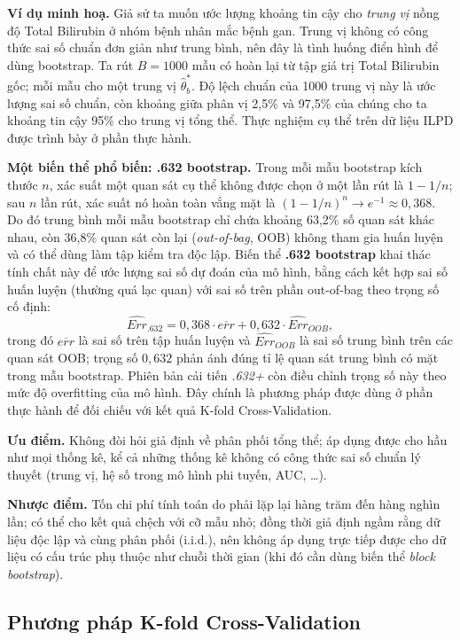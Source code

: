 \documentclass[14pt,a4paper]{extarticle}\usepackage[]{graphicx}\usepackage[]{xcolor}
\begin{document}
\textbf{Ví dụ minh hoạ.} Giả sử ta muốn ước lượng khoảng tin cậy cho
\emph{trung vị} nồng độ Total Bilirubin ở nhóm bệnh nhân mắc bệnh gan.
Trung vị không có công thức sai số chuẩn đơn giản như trung bình, nên đây
là tình huống điển hình để dùng bootstrap. Ta rút $B = 1000$ mẫu có hoàn
lại từ tập giá trị Total Bilirubin gốc; mỗi mẫu cho một trung vị
$\hat{\theta}^{*}_{b}$. Độ lệch chuẩn của 1000 trung vị này là ước lượng
sai số chuẩn, còn khoảng giữa phân vị 2,5\% và 97,5\% của chúng cho ta
khoảng tin cậy 95\% cho trung vị tổng thể. Thực nghiệm cụ thể trên dữ liệu
ILPD được trình bày ở phần thực hành.

\textbf{Một biến thể phổ biến: .632 bootstrap.} Trong mỗi mẫu bootstrap
kích thước $n$, xác suất một quan sát cụ thể không được chọn ở một lần rút
là $1 - 1/n$; sau $n$ lần rút, xác suất nó hoàn toàn vắng mặt là
$(1 - 1/n)^{n} \to e^{-1} \approx 0{,}368$. Do đó trung bình mỗi mẫu
bootstrap chỉ chứa khoảng 63,2\% số quan sát khác nhau, còn 36,8\% quan
sát còn lại (\emph{out-of-bag}, OOB) không tham gia huấn luyện và có thể
dùng làm tập kiểm tra độc lập. Biến thể \textbf{.632 bootstrap} khai thác
tính chất này để ước lượng sai số dự đoán của mô hình, bằng cách kết hợp
sai số huấn luyện (thường quá lạc quan) với sai số trên phần out-of-bag
theo trọng số cố định:
\[
  \widehat{Err}_{.632} = 0{,}368 \cdot \overline{err}
  + 0{,}632 \cdot \widehat{Err}_{OOB},
\]
trong đó $\overline{err}$ là sai số trên tập huấn luyện và
$\widehat{Err}_{OOB}$ là sai số trung bình trên các quan sát OOB; trọng
số $0{,}632$ phản ánh đúng tỉ lệ quan sát trung bình có mặt trong
mẫu bootstrap. Phiên bản cải tiến \emph{.632+} còn điều chỉnh trọng số này
theo mức độ overfitting của mô hình. Đây chính là phương pháp được dùng ở
phần thực hành để đối chiếu với kết quả K-fold Cross-Validation.

\textbf{Ưu điểm.} Không đòi hỏi giả định về phân phối tổng thể; áp dụng
được cho hầu như mọi thống kê, kể cả những thống kê không có công thức sai
số chuẩn lý thuyết (trung vị, hệ số trong mô hình phi tuyến, AUC, \ldots).

\textbf{Nhược điểm.} Tốn chi phí tính toán do phải lặp lại hàng trăm đến
hàng nghìn lần; có thể cho kết quả chệch với cỡ mẫu nhỏ; đồng thời giả
định ngầm rằng dữ liệu độc lập và cùng phân phối (i.i.d.), nên không áp
dụng trực tiếp được cho dữ liệu có cấu trúc phụ thuộc như chuỗi thời gian
(khi đó cần dùng biến thể \emph{block bootstrap}).

\subsection{Phương pháp K-fold Cross-Validation}
\end{document}
